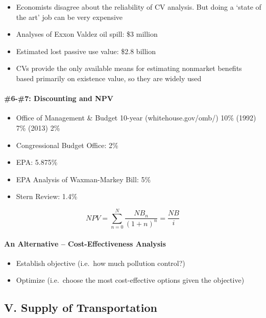 \documentclass[]{article}
\providecommand{\tightlist}{%
  \setlength{\itemsep}{0pt}\setlength{\parskip}{0pt}}
\let\oldparagraph\paragraph
\renewcommand{\paragraph}[1]{\oldparagraph{#1}\mbox{}}
\begin{document}
\begin{itemize}
\tightlist
\item
  Economists disagree about the reliability of CV analysis. But doing a
  `state of the art' job can be very expensive
\item
  Analyses of Exxon Valdez oil spill: \$3 million
\item
  Estimated lost passive use value: \$2.8 billion
\item
  CVs provide the only available means for estimating nonmarket benefits
  based primarily on existence value, so they are widely used
\end{itemize}

\hypertarget{discounting-and-npv}{%
\paragraph{\#6-\#7: Discounting and NPV}\label{discounting-and-npv}}

\begin{itemize}
\tightlist
\item
  Office of Management \& Budget 10-year (whitehouse.gov/omb/) 10\%
  (1992) 7\% (2013) 2\%
\item
  Congressional Budget Office: 2\%
\item
  EPA: 5.875\%
\item
  EPA Analysis of Waxman-Markey Bill: 5\%
\item
  Stern Review: 1.4\%
\end{itemize}

\[NPV=\sum_{n=0}^N\frac{NB_n}{(1+n)^n}= \frac{NB}i\]

\hypertarget{an-alternative-cost-effectiveness-analysis}{%
\paragraph{An Alternative -- Cost-Effectiveness
Analysis}\label{an-alternative-cost-effectiveness-analysis}}

\begin{itemize}
\tightlist
\item
  Establish objective (i.e.~how much pollution control?)
\item
  Optimize (i.e.~choose the most cost-effective options given the
  objective)
\end{itemize}

\hypertarget{v.-supply-of-transportation}{%
\subsection{V. Supply of
Transportation}\label{v.-supply-of-transportation}}
\end{document}
